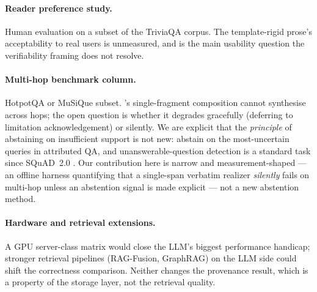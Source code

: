 \paragraph{Reader preference study.} Human evaluation on a
subset of the TriviaQA corpus. The template-rigid prose's
acceptability to real users is unmeasured, and is the main
usability question the verifiability framing does not resolve.

\paragraph{Multi-hop benchmark column.} HotpotQA or MuSiQue
subset. \hyphae{}'s single-fragment composition cannot synthesise
across hops; the open question is whether it degrades gracefully
(deferring to limitation acknowledgement) or silently. We are
explicit that the \emph{principle} of abstaining on insufficient
support is not new: \citet{menick2022gophercite} abstain on the
most-uncertain queries in attributed QA, and unanswerable-question
detection is a standard task since SQuAD~2.0
\citep{rajpurkar2018squad2}. Our contribution here is narrow and
measurement-shaped --- an offline harness quantifying that a
single-span verbatim realizer \emph{silently} fails on multi-hop
unless an abstention signal is made explicit --- not a new
abstention method.

\paragraph{Hardware and retrieval extensions.} A GPU server-class
matrix would close the LLM's biggest performance handicap;
stronger retrieval pipelines (RAG-Fusion, GraphRAG) on the LLM
side could shift the correctness comparison. Neither changes the
provenance result, which is a property of the storage layer, not
the retrieval quality.
